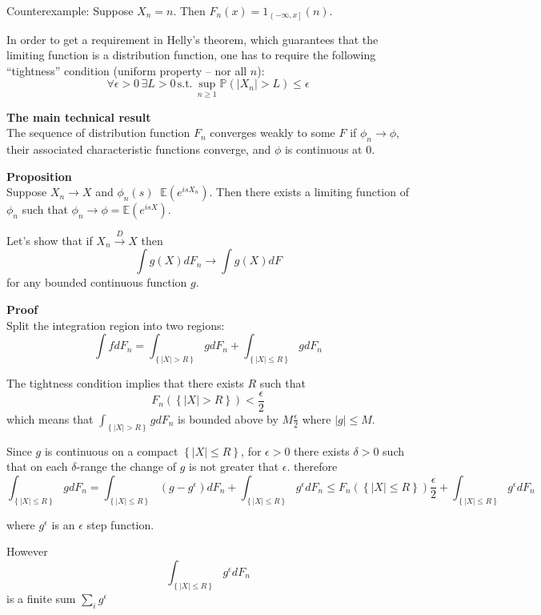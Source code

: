 \documentclass[a4paper]{article}
\newcommand{\obj}[1]{{\left\{ #1 \right \}}}
\newcommand{\ploc}[1]{{\left ( #1 \right ]}}
\newcommand{\brac}[1]{{\left ( #1 \right )}}
\newcommand{\abs}[1]{{\left | #1 \right |}}
\newcommand{\Ex}{\mathbb{E}}
\newcommand{\pr}{\mathbb{P}}
\newcommand{\defn}{\mathop{\overset{\Delta}{=}}\nolimits}
\begin{document}
Counterexample:
Suppose $X_n=n$. Then $F_n(x) = 1_{\ploc{-\infty, x}}(n)$.

In order to get a requirement in Helly's theorem, which guarantees that the limiting function is a distribution function, one has to require the following ``tightness'' condition (uniform property -- nor all $n$):
\[\forall \epsilon>0\,\exists L>0\,\text{s.t.}\,\sup_{n\geq1}\pr\brac{\abs{X_n}>L}\leq \epsilon\]



\noindent \textbf{The main technical result}\hfill\\

The sequence of distribution function $F_n$ converges weakly to some $F$ if $\phi_n\to \phi$, their associated characteristic functions converge, and $\phi$ is continuous at $0$.

\noindent \textbf{Proposition}\hfill\\

Suppose $X_n\to X$ and $\phi_n(s)\defn \Ex\brac{e^{isX_n}}$. Then there exists a limiting function of $\phi_n$ such that $\phi_n\to \phi = \Ex\brac{e^{isX}}$.

Let's show that if $X_n\overset{D}{\to} X$ then
\[\int g(X) dF_n \to \int g(X)dF\]
for any bounded continuous function $g$.

\textbf{Proof}\hfill\\
Split the integration region into two regions:
\[\int f dF_n = \int_\obj{\abs{X}>R} g dF_n + \int_\obj{\abs{X}\leq R} g dF_n\]

The tightness condition implies that there exists $R$ such that
\[F_n\brac{\obj{\abs{X}>R}}< \frac{\epsilon}{2}\]
which means that $\int_\obj{\abs{X}>R} g dF_n$ is bounded above by $M\frac{\epsilon}{2}$ where $\abs{g}\leq M$.

Since $g$ is continuous on a compact $\obj{\abs{X}\leq R}$, for $\epsilon>0$ there exists $\delta>0$ such that on each $\delta$-range the change of $g$ is not greater that $\epsilon$.
therefore 
\[\int_\obj{\abs{X}\leq R} g dF_n = \int_\obj{\abs{X}\leq R} (g-g^\epsilon) dF_n + \int_\obj{\abs{X}\leq R} g^\epsilon dF_n \leq F_n\brac{\obj{\abs{X}\leq R}}\frac{\epsilon}{2} + \int_\obj{\abs{X}\leq R} g^\epsilon dF_n\]

where $g^\epsilon$ is an $\epsilon$ step function.

However
\[\int_\obj{\abs{X}\leq R} g^\epsilon dF_n\]
is a finite sum $\sum_i g^\epsilon$
\end{document}
